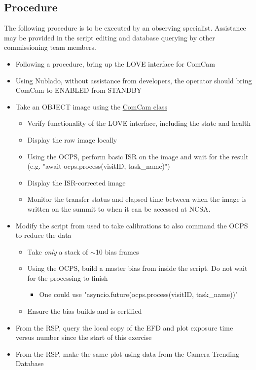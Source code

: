 \subsection{Procedure}
The following procedure is to be executed by an observing specialist. Assistance may be provided in the script editing and database querying by other commissioning team members.
\begin{itemize}
	\item Following a procedure, bring up the LOVE interface for ComCam
	\item Using Nublado, without assistance from developers, the operator should bring ComCam to ENABLED from STANDBY
	\item Take an OBJECT image using the \href{https://ts-observatory-control.lsst.io/py-api/lsst.ts.observatory.control.maintel.ComCam.html}{ComCam class}
	\begin{itemize}
		\item Verify functionality of the \gls{LOVE} interface, including the state and health
		\item Display the raw image locally
		\item Using the OCPS, perform basic \gls{ISR} on the image and wait for the result (e.g. "await ocps.process(visitID, task\_name)")
		\item Display the ISR-corrected image
		\item Monitor the transfer status and elapsed time between when the image is written on the summit to when it can be accessed at NCSA.
	\end{itemize}	
	\item Modify the script from  used to take calibrations to also command the \gls{OCPS} to reduce the data
	\begin{itemize}
		\item Take \emph{only} a stack of $\sim$10 bias frames
		\item Using the \gls{OCPS}, build a master bias from inside the script. Do not wait for the processing to finish 
			\begin{itemize}
				\item One could use "asyncio.future(ocps.process(visitID, task\_name))"
			\end{itemize}
		\item Ensure the bias builds and is certified %
	\end{itemize}
	\item From the \gls{RSP}, query the local copy of the EFD and plot exposure time versus number since the start of this exercise
	\item From the RSP, make the same plot using data from the Camera Trending Database
\end{itemize}


